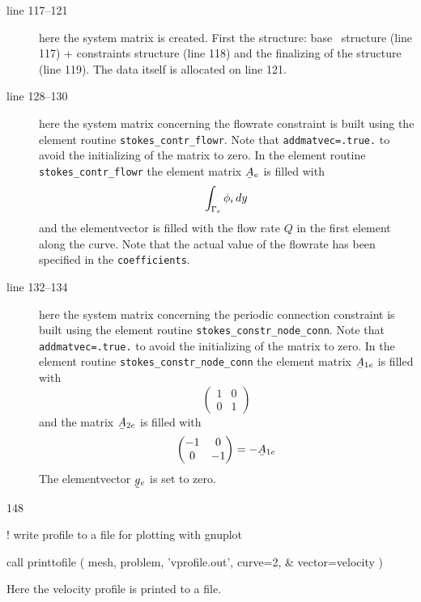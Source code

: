 \begin{description}
   \item[line 117--121] here the system matrix is created. First the structure:
     base \fem\ structure (line 117) + constraints structure (line 118) and the
     finalizing of the structure (line 119).
     The data itself is allocated on line 121.
   \item[line 128--130] here the system matrix concerning the flowrate
     constraint is built using the element routine
     \texttt{stokes\_contr\_flowr}. Note that \texttt{addmatvec=.true.} to
     avoid the initializing of the matrix to zero. In the element routine
     \texttt{stokes\_contr\_flowr} the element
      matrix $\mat A_e$ is filled with
     \[
          \int_{\Gamma_e}\phi_i\,d y
     \]
     and the elementvector is filled with the flow rate $Q$ in the first element
     along the curve. Note that the actual value of the flowrate has been
     specified in the \texttt{coefficients}.
   \item[line 132--134] here the system matrix concerning the periodic
     connection constraint is built using the element routine
     \texttt{stokes\_constr\_node\_conn}. Note that \texttt{addmatvec=.true.} to
     avoid the initializing of the matrix to zero. In the element routine
     \texttt{stokes\_constr\_node\_conn} the element
      matrix $\mat A_{1e}$ is filled with
     \[
          \begin{pmatrix}
             1 & 0 \\
             0 & 1
          \end{pmatrix}
     \]
     and the matrix $\mat A_{2e}$ is filled with
     \[
          \begin{pmatrix}
             -1 & 0 \\
             0 & -1
          \end{pmatrix}=-\mat A_{1e}
     \]
     The elementvector $\col g_e$ is set to zero.
\end{description}
\begin{listing}{148}

! write profile to a file for plotting with gnuplot

  call printtofile ( mesh, problem, 'vprofile.out', curve=2, &
    vector=velocity )
   
\end{listing}
Here the velocity profile is printed to a file.

